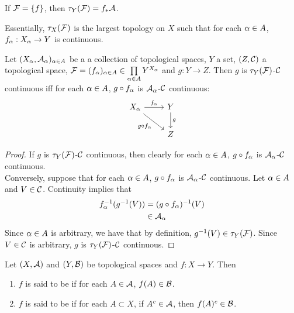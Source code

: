 \documentclass{book}
\begin{document}
	\begin{note}
	If $\mathcal{F} = \{f\}$, then $\tau_Y(\mathcal{F}) = f_*\mathcal{A}$.
	\end{note}
	
	\begin{note}
	Essentially, $\tau_X(\mathcal{F})$ is the largest topology on $X$ such that for each $\alpha \in A$, $f_{\alpha}:X_{\alpha} \rightarrow Y$ is continuous. 
	\end{note}
	
	\begin{ex}
	Let $(X_{\alpha}, \mathcal{A}_{\alpha})_{\alpha \in A}$ be a a collection of topological spaces, $Y$ a set, $(Z, \mathcal{C})$ a topological space, $\mathcal{F} = (f_{\alpha})_{\alpha \in A} \in \prod \limits_{\alpha \in A}Y^{X_{\alpha}}$ and $g: Y \rightarrow Z$. Then $g$ is $\tau_Y(\mathcal{F})$-$\mathcal{C}$ continuous iff for each $\alpha \in A$, $g \circ f_{\alpha}$ is $\mathcal{A}_{\alpha}$-$\mathcal{C}$ continuous:
	\[ \begin{tikzcd}
	X_{\al} \arrow[r, "f_{\al}"] \arrow[dr, "g \circ f_{\al}"'] 	
	& Y  \arrow[d, "g"] \\
	& Z 
\end{tikzcd}
	\]
	\end{ex}
	
	\begin{proof}
	If $g$ is $\tau_Y(\mathcal{F})$-$\mathcal{C}$ continuous, then clearly for each $\alpha \in A$, $g \circ f_{\alpha}$ is $\mathcal{A}_{\alpha}$-$\mathcal{C}$ continuous. \\
	Conversely, suppose that for each $\alpha \in A$, $g \circ f_{\alpha}$ is $\mathcal{A}_{\alpha}$-$\mathcal{C}$ continuous. Let $\alpha \in A$ and $V \in \mathcal{C}$. Continuity implies that 
	\begin{align*}
		f_{\alpha}^{-1}(g^{-1}(V)) 
		& = (g \circ f_{\alpha})^{-1}(V) \\
		& \in \mathcal{A}_{\alpha}
	\end{align*}
	Since $\alpha \in A$ is arbitrary, we have that by definition, $g^{-1}(V) \in \tau_Y(\mathcal{F})$. Since $V \in \mathcal{C}$ is arbitrary, $g$ is $\tau_Y(\mathcal{F})$-$\mathcal{C}$ continuous.
	\end{proof}
	
	\begin{defn} \ld{}
		Let $(X,\mathcal{A})$ and $(Y,\mathcal{B})$ be topological spaces and $f:X \rightarrow Y$. Then 
		\begin{enumerate}
			\item $f$ is said to be  if for each $A \in \mathcal{A}$, $f(A) \in \mathcal{B}$.
			\item $f$ is said to be  if for each $A \subset X$, if $A^c \in \mathcal{A}$, then $f(A)^c \in \mathcal{B}$. 
		\end{enumerate}
	\end{defn}
\end{document}
